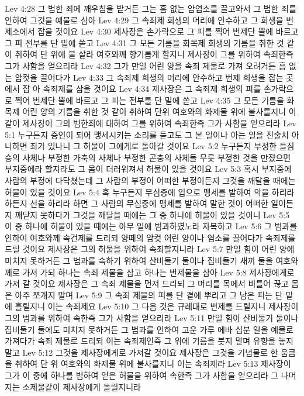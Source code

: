 Lev 4:28  그 범한 죄에 깨우침을 받거든 그는 흠 없는 암염소를 끌고와서 그 범한 죄를 인하여 그것을 예물로 삼아
Lev 4:29  그 속죄제 희생의 머리에 안수하고 그 희생을 번제소에서 잡을 것이요
Lev 4:30  제사장은 손가락으로 그 피를 찍어 번제단 뿔에 바르고 그 피 전부를 단 밑에 쏟고
Lev 4:31  그 모든 기름을 화목제 희생의 기름을 취한 것 같이 취하여 단 위에 불 살라 여호와께 향기롭게 할지니 제사장이 그를 위하여 속죄한즉 그가 사함을 얻으리라
Lev 4:32  그가 만일 어린 양을 속죄 제물로 가져 오려거든 흠 없는 암컷을 끌어다가
Lev 4:33  그 속죄제 희생의 머리에 안수하고 번제 희생을 잡는 곳에서 잡 아 속죄제를 삼을 것이요
Lev 4:34  제사장은 그 속죄제 희생의 피를 손가락으로 찍어 번제단 뿔에 바르고 그 피는 전부를 단 밑에 쏟고
Lev 4:35  그 모든 기름을 화목제 어린 양의 기름을 취한 것 같이 취하여 단위 여호와의 화제물 위에 불사를지니 이같이 제사장이 그의 범한죄에 대하여 그를 위하여 속죄한즉 그가 사함을 얻으리라
Lev 5:1  누구든지 증인이 되어 맹세시키는 소리를 듣고도 그 본 일이나 아는 일을 진술치 아니하면 죄가 있나니 그 허물이 그에게로 돌아갈 것이요
Lev 5:2  누구든지 부정한 들짐승의 사체나 부정한 가축의 사체나 부정한 곤충의 사체들 무릇 부정한 것을 만졌으면 부지중에라 할지라도 그 몸이 더러워져서 허물이 있을 것이요
Lev 5:3  혹시 부지중에 사람의 부정에 다닥쳤는데 그 사람의 부정이 어떠한 부정이든지 그것을 깨달을 때에는 허물이 있을 것이요
Lev 5:4  혹 누구든지 무심중에 입으로 맹세를 발하여 악을 하리라 하든지 선을 하리라 하면 그 사람의 무심중에 맹세를 발하여 말한 것이 어떠한 일이든지 깨닫지 못하다가 그것을 깨달을 때에는 그 중 하나에 허물이 있을 것이니
Lev 5:5  이 중 하나에 허물이 있을 때에는 아무 일에 범과하였노라 자복하고
Lev 5:6  그 범과를 인하여 여호와께 속건제를 드리되 양떼의 암컷 어린 양이나 염소를 끌어다가 속죄제를 드릴 것이요 제사장은 그의 허물을 위하여 속죄할지니라
Lev 5:7  만일 힘이 어린 양에 미치지 못하거든 그 범과를 속하기 위하여 산비둘기 둘이나 집비둘기 새끼 둘을 여호와께로 가져 가되 하나는 속죄 제물을 삼고 하나는 번제물을 삼아
Lev 5:8  제사장에게로 가져 갈 것이요 제사장은 그 속죄 제물을 먼저 드리되 그 머리를 목에서 비틀어 끊고 몸은 아주 쪼개지 말며
Lev 5:9  그 속죄 제물의 피를 단 곁에 뿌리고 그 남은 피는 단 밑에 흘릴지니 이는 속죄제요
Lev 5:10  그 다음 것은 규례대로 번제를 드릴지니 제사장이 그의 범과를 위하여 속한즉 그가 사함을 얻으리라
Lev 5:11  만일 힘이 산비둘기 둘이나 집비둘기 둘에도 미치지 못하거든 그 범과를 인하여 고운 가루 에바 십분 일을 예물로 가져다가 속죄 제물로 드리되 이는 속죄제인즉 그 위에 기름을 붓지 말며 유향을 놓지 말고
Lev 5:12  그것을 제사장에게로 가져갈 것이요 제사장은 그것을 기념물로 한 움큼을 취하여 단 위 여호와의 화제물 위에 불사를지니 이는 속죄제라
Lev 5:13  제사장이 그가 이 중에 하나를 범하여 얻은 허물을 위하여 속한즉 그가 사함을 얻으리라 그 나머지는 소제물같이 제사장에게 돌릴지니라
